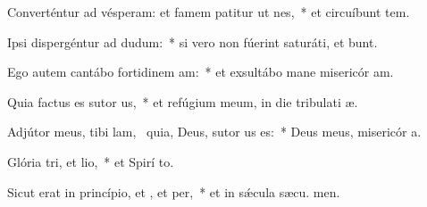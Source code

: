 \item Converténtur ad vésperam: et famem patitur ut nes,~* et circuíbunt tem.
\item Ipsi dispergéntur ad dudum:~* si vero non fúerint saturáti, et bunt.
\item Ego autem cantábo fortidinem am:~* et exsultábo mane misericór am.
\item Quia factus es sutor us,~* et refúgium meum, in die tribulati æ.
\item Adjútor meus, tibi lam,~\pscross{} quia, Deus, sutor us es:~* Deus meus, misericór a.
\item Glória tri, et lio,~* et Spirí to.
\item Sicut erat in princípio, et , et per,~* et in sǽcula sæcu. men.
